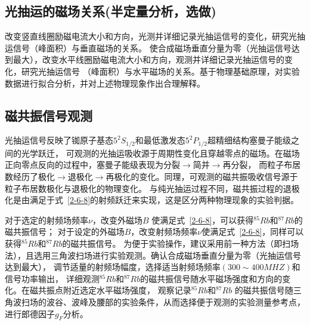 \documentclass[11pt,a4paper]{article}
\begin{document}
\begin{spacing}{1.3}
\begin{CJK*}{UTF8}{gbsn}
\subsection{光抽运的磁场关系(半定量分析，选做)}
改变竖直线圈励磁电流大小和方向，光测并详细记录光抽运信号的变化，研究光抽运信号（峰面积）与垂直磁场的关系。
使合成磁场垂直分量为零（光抽运信号达到最大），改变水平线圈励磁电流大小和方向，观测并详细记录光抽运信号的变化，研究光抽运信号
（峰面积）与水平磁场的关系。基于物理基础原理，对实验数据进行拟合分析，并对上述物理现象作出合理解释。

\subsection{磁共振信号观测}
光抽运信号反映了铷原子基态$5^2S_{1/2}$和最低激发态$5^2P_{1/2}$超精细结构塞曼子能级之间的光学跃迁，
可观测的光抽运吸收源于周期性变化且穿越零点的磁场。在磁场正向零点反向的过程中，塞曼子能级表现为分裂$\to$简并$\to$再分裂，
而粒子布居数经历了极化$\to$退极化$\to$再极化的变化。同理，可观测的磁共振吸收信号源于粒子布居数极化与退极化的物理变化。
与纯光抽运过程不同，磁共振过程的退极化是由满足于式~\eqref{2-6-8}的射频跃迁来实现，这是区分两种物理现象的实验判据。\par
对于选定的射频场频率$\nu$，改变外磁场$B$ 使满足式~\eqref{2-6-8}，可以获得$^{85}Rb$和$^{87}Rb$的磁共振信号；
对于设定的外磁场$B$，改变射频场频率$\nu$使满足式~\eqref{2-6-8}，同样可以获得$^{85}Rb$和$^{87}Rb$的磁共振信号。
为便于实验操作，建议采用前一种方法（即扫场法），且选用三角波扫场进行实验观测。确认合成磁场垂直分量为零（光抽运信号达到最大），
调节适量的射频场幅度，选择适当射频场频率$(300\sim 400MHZ)$和信号功率输出，
详细观测$^{85}Rb$和$^{87}Rb$的磁共振信号随水平磁场强度和方向的变化。在磁共振点附近选定水平磁场强度，
观察记录$^{85}Rb$和$^{87}Rb$ 的磁共振信号随三角波扫场的波谷、波峰及腰部的实验条件，从而选择便于观测的实验测量参考点，
进行郎德因子$g_F$分析。


\end{CJK*}
\end{spacing}
\end{document}
